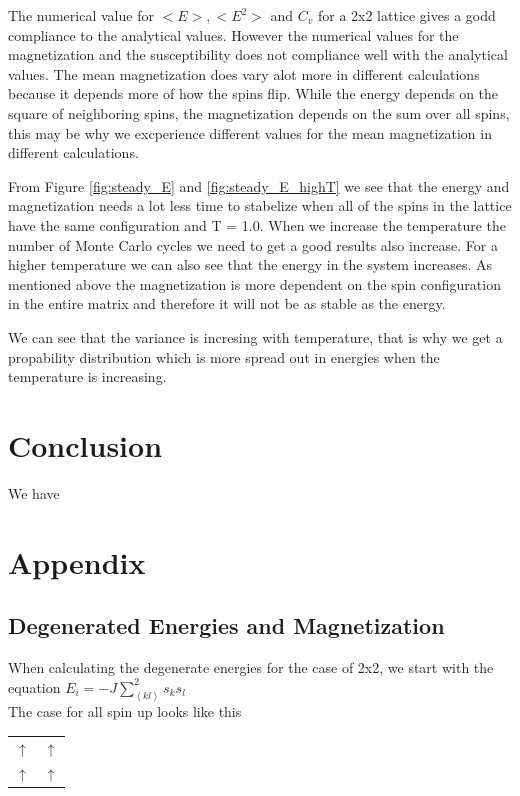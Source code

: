 \documentclass{article}
\begin{document}
{{The numerical value for $<E>, <E^2>$ and $C_v$ for a 2x2 lattice gives a godd compliance to the analytical values. However the numerical values for the magnetization and the susceptibility does not compliance well with the analytical values. The mean magnetization does vary alot more in different calculations because it depends more of how the spins flip. While the energy depends on the square of neighboring spins, the magnetization depends on the sum over all spins, this may be why we excperience different values for the mean magnetization in different calculations.

From Figure \ref{fig:steady_E} and \ref{fig:steady_E_highT} we see that the energy and magnetization needs a lot less time to stabelize when all of the spins in the lattice have the same configuration and T = 1.0. When we increase the temperature the number of Monte Carlo cycles we need to get a good results also increase. For a higher temperature we can also see that the energy in the system increases. As mentioned above the magnetization is more dependent on the spin configuration in the entire matrix and therefore it will not be as stable as the energy.



We can see that the variance is incresing with temperature, that is why we get a propability distribution which is more spread out in energies when the temperature is increasing.

\section{Conclusion}
We have

\section{Appendix}

\subsection{Degenerated Energies and Magnetization}

When calculating the degenerate energies for the case of 2x2, we start with the equation $E_i=-J\sum\limits_{\left<kl\right>}^{2}s_ks_l$\\
The case for all spin up looks like this
\begin{tabular}{c c}
  $\uparrow$ & $\uparrow$\\
  $\uparrow$ & $\uparrow$
\end{tabular}\\

}}
\end{document}
